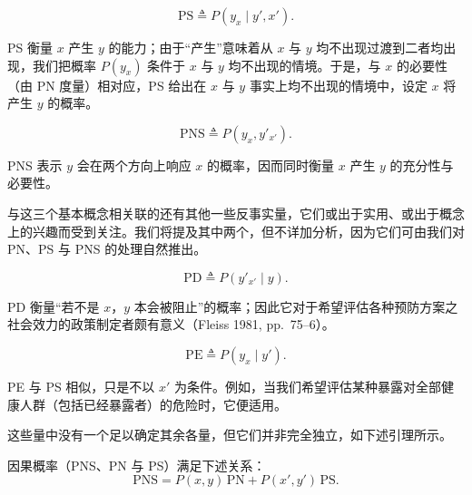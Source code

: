 \begin{definition}[充分性概率，PS]
\begin{equation}
\mathrm{PS}\triangleq P(y_x\mid y',x'). \tag{9.2}
\end{equation}
\end{definition}

PS 衡量 $x$ 产生 $y$ 的能力；由于“产生”意味着从 $x$ 与 $y$ 均不出现过渡到二者均出现，我们把概率 $P(y_x)$ 条件于 $x$ 与 $y$ 均不出现的情境。于是，与 $x$ 的必要性（由 PN 度量）相对应，PS 给出在 $x$ 与 $y$ 事实上均不出现的情境中，设定 $x$ 将产生 $y$ 的概率。

\begin{definition}
\begin{equation}
\mathrm{PNS}\triangleq P(y_x,y'_{x'}). \tag{9.3}
\end{equation}
\end{definition}

PNS 表示 $y$ 会在两个方向上响应 $x$ 的概率，因而同时衡量 $x$ 产生 $y$ 的充分性与必要性。

与这三个基本概念相关联的还有其他一些反事实量，它们或出于实用、或出于概念上的兴趣而受到关注。我们将提及其中两个，但不详加分析，因为它们可由我们对 PN、PS 与 PNS 的处理自然推出。

\begin{definition}[阻抑概率，PD]
\begin{equation}
\mathrm{PD}\triangleq P(y'_{x'}\mid y). \tag{9.4}
\end{equation}
\end{definition}

PD 衡量“若不是 $x$，$y$ 本会被阻止”的概率；因此它对于希望评估各种预防方案之社会效力的政策制定者颇有意义（Fleiss 1981, pp.~75--6）。

\begin{definition}[促成概率，PE]
\[
\mathrm{PE}\triangleq P(y_x\mid y').
\]
\end{definition}

PE 与 PS 相似，只是不以 $x'$ 为条件。例如，当我们希望评估某种暴露对全部健康人群（包括已经暴露者）的危险时，它便适用。

这些量中没有一个足以确定其余各量，但它们并非完全独立，如下述引理所示。

\begin{lemma}
因果概率（PNS、PN 与 PS）满足下述关系：
\begin{equation}
\mathrm{PNS}=P(x,y)\,\mathrm{PN}+P(x',y')\,\mathrm{PS}. \tag{9.5}
\end{equation}
\end{lemma}

